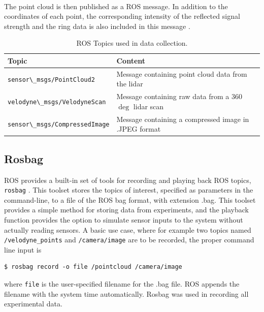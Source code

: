 \vspace{2mm}\\
\noindent The point cloud is then published as a ROS message. In addition to the coordinates of each point, the corresponding intensity of the reflected signal strength and the ring data is also included in this message \cite{velodyne_driver}.\\
\begin{table}[!htb]
	\centering
	\begin{tabularx}{.8\linewidth}{l L}\toprule
		\textbf{Topic} & \textbf{Content} \\\midrule
		\lstinline[basicstyle=\ttfamily]{sensor\_msgs/PointCloud2} & Message containing point cloud data from the lidar \\\midrule
		\lstinline[basicstyle=\ttfamily]{velodyne\_msgs/VelodyneScan} & Message containing raw data from a 360$\deg$ lidar scan \\\midrule
		\lstinline[basicstyle=\ttfamily]{sensor\_msgs/CompressedImage} & Message containing a compressed image in .JPEG format\\\midrule
		\end{tabularx}
	\caption{ROS Topics used in data collection.}
	\label{tab:topics}
\end{table}
\subsection{Rosbag}
ROS provides a built-in set of tools for recording and playing back ROS topics, \lstinline[basicstyle=\ttfamily]{rosbag} \cite{rosbag}. This toolset stores the topics of interest, specified as parameters in the command-line, to a file of the ROS bag format, with extension .bag. This toolset provides a simple method for storing data from experiments, and the playback function provides the option to simulate sensor inputs to the system without actually reading sensors. A basic use case, where for example two topics named \lstinline[basicstyle=\ttfamily]{/velodyne_points} and \lstinline[basicstyle=\ttfamily]{/camera/image} are to be recorded, the proper command line input is 
\begin{lstlisting}[basicstyle=\ttfamily]
	$ rosbag record -o file /pointcloud /camera/image
\end{lstlisting}
where \lstinline[basicstyle=\ttfamily]{file} is the user-specified filename for the .bag file. ROS appends the filename with the system time automatically. Rosbag was used in recording all experimental data.
